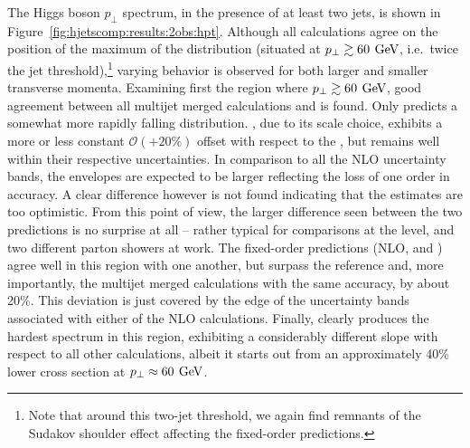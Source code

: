 The Higgs boson $p_\perp$ spectrum, in the presence of at least two
jets, is shown in Figure~\ref{fig:hjetscomp:results:2obs:hpt}.
Although all calculations agree on the position of the maximum
of the distribution (situated at $p_\perp\gtrsim 60\,\text{\:GeV}$, i.e.~twice the 
jet threshold),\footnote{Note that around this two-jet threshold, we
  again find remnants of the Sudakov shoulder effect affecting the
  fixed-order predictions.}
varying behavior is observed for both larger and smaller 
transverse momenta. Examining first the region where $p_\perp\gtrsim 
60\,\text{\:GeV}$, good agreement between all multijet merged calculations and 
\hjetscompPowheg is found. Only \hjetscompHerwig predicts a somewhat more rapidly falling 
distribution. \hjetscompSherpa \hjetscompNNLOPS, due to its scale choice, exhibits a 
more or less constant $\mathcal{O}(+20\%)$ offset with respect to the
\hjetscompPowheg \hjetscompNNLOPS, but remains well within their respective uncertainties.
In comparison to all the NLO uncertainty bands, the \hjetscompNNLOPS envelopes
are expected to be larger reflecting the loss of one order in accuracy.
A clear difference however is not found indicating that the \hjetscompNNLOPS
estimates are too optimistic. From this point of view, the larger
difference seen between the two \hjetscompNNLOPS predictions is no surprise at
all -- rather typical for comparisons at the \hjetscompLOPS level, and two
different parton showers at work. The fixed-order
predictions (NLO, \hjetscompMinlo and \hjetscompLoopsim) agree well in this region with
one another, but surpass the \hjetscompPowheg reference and, more importantly,
the multijet merged calculations with the same accuracy, by about 
20\%. This deviation is just covered by the edge of the uncertainty
bands associated with either of the NLO calculations. Finally, \hjetscompHej
clearly produces the hardest spectrum in this region, exhibiting a
considerably different slope with respect to all other calculations,
albeit it starts out from an approximately 40\% lower cross section at
$p_\perp\approx 60\,\text{\:GeV}$.

